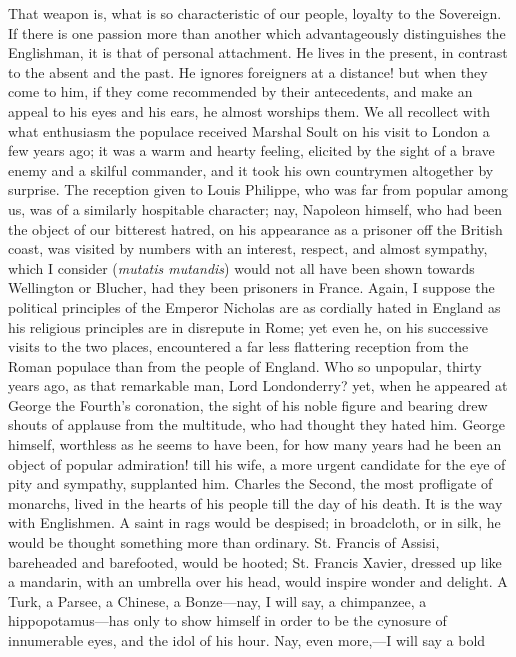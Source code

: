 That weapon is, what is so characteristic of our
people, loyalty to the Sovereign. If there is one passion
more than another which advantageously distinguishes the
Englishman, it is that of personal attachment. He lives
in the present, in contrast to the absent and the past.
He ignores foreigners at a distance! but when they come
to him, if they come recommended by their antecedents,
and make an appeal to his eyes and his ears, he almost
worships them. We all recollect with what enthusiasm the
populace received Marshal Soult on his visit to London a
few years ago; it was a warm and hearty feeling, elicited
by the sight of a brave enemy and a skilful commander,
and it took his own countrymen altogether by surprise.
The reception given to Louis Philippe, who was far from
popular among us, was of a similarly hospitable
character; nay, Napoleon himself, who had been the object
of our bitterest hatred, on his appearance as a prisoner
off the British coast, was visited by numbers with an
interest, respect, and almost sympathy, which I consider
(\emph{mutatis mutandis}) would not all have been shown
towards Wellington or Blucher, had they been prisoners in
France. Again, I suppose the political principles of the
Emperor Nicholas are as cordially hated in England as his
religious principles are in disrepute in Rome; yet even
he, on his successive visits to the two places,
encountered a far less flattering reception from the
Roman populace than from the people of England. Who so
unpopular, thirty years ago, as that remarkable man, Lord
Londonderry? yet, when he appeared at George the Fourth's
coronation, the sight of his noble figure and bearing
drew shouts of applause from the multitude, who had
thought they hated him. George himself, worthless as he
seems to have been, for how many years had he been an
object of popular admiration! till his wife, a more
urgent candidate for the eye of pity and sympathy,
supplanted him. Charles the Second, the most profligate
of monarchs, lived in the hearts of his people till the
day of his death. It is the way with Englishmen. A saint
in rags would be despised; in broadcloth, or in silk, he
would be thought something more than ordinary. St. Francis of Assisi, bareheaded and barefooted,
would be hooted; St. Francis Xavier, dressed up like a
mandarin, with an umbrella over his head, would inspire
wonder and delight. A Turk, a Parsee, a Chinese, a
Bonze—nay, I will say, a chimpanzee, a
hippopotamus—has only to show himself in order to be
the cynosure of innumerable eyes, and the idol of his
hour. Nay, even more,—I will say a bold
